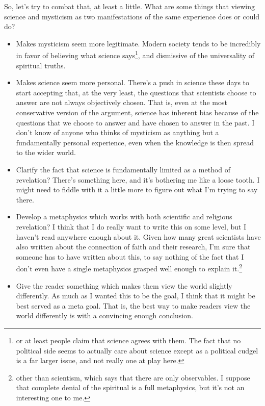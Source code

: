 \documentclass[12pt]{article}[titlepage]
\newcommand{\1}{\={a}}
\newcommand{\2}{\={e}}
\newcommand{\3}{\={\i}}
\newcommand{\4}{\=o}
\newcommand{\5}{\=u}
\newcommand{\6}{\={A}}
\renewcommand{\,}{\textsuperscript{,}}
\begin{document}
So, let's try to combat that, at least a little.
What are some things that viewing science and mysticism as two manifestations of the same experience does or could do?
\begin{itemize}
\item Makes mysticism seem more legitimate. Modern society tends to be incredibly in favor of believing what science says\footnote{or at least people claim that science agrees with them. The fact that no political side seems to actually care about science except as a political cudgel is a far larger issue, and not really one at play here.}, and dismissive of the universality of spiritual truths.
\item Makes science seem more personal. There's a push in science these days to start accepting that, at the very least, the questions that scientists choose to answer are not always objectively chosen.
That is, even at the most conservative version of the argument, science has inherent bias because of the questions that we choose to answer and have chosen to answer in the past.
I don't know of anyone who thinks of mysticism as anything but a fundamentally personal experience, even when the knowledge is then spread to the wider world.
\item Clarify the fact that science is fundamentally limited as a method of revelation? There's something here, and it's bothering me like a loose tooth. I might need to fiddle with it a little more to figure out what I'm trying to say there.
\item Develop a metaphysics which works with both scientific and religious revelation? I think that I do really want to write this on some level, but I haven't read anywhere enough about it. Given how many great scientists have also written about the connection of faith and their research, I'm sure that someone has to have written about this, to say nothing of the fact that I don't even have a single metaphysics grasped well enough to explain it.\footnote{other than scientism, which says that there are only observables. I suppose that complete denial of the spiritual is a full metaphysics, but it's not an interesting one to me.}
\item Give the reader something which makes them view the world slightly differently.
As much as I wanted this to be the goal, I think that it might be best served as a meta goal.
That is, the best way to make readers view the world differently is with a convincing enough conclusion.
\end{itemize}
\end{document}
